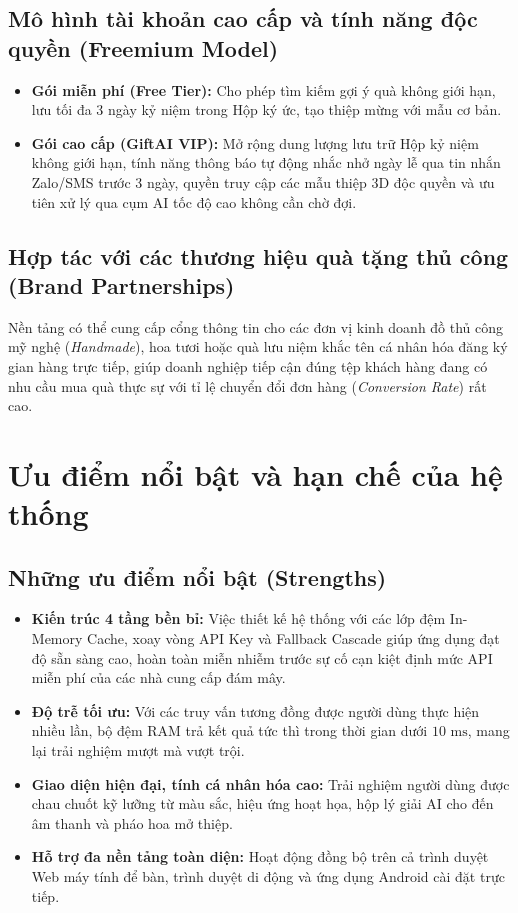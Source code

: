 \subsection{Mô hình tài khoản cao cấp và tính năng độc quyền (Freemium Model)}
\begin{itemize}
    \item \textbf{Gói miễn phí (Free Tier):} Cho phép tìm kiếm gợi ý quà không giới hạn, lưu tối đa 3 ngày kỷ niệm trong Hộp ký ức, tạo thiệp mừng với mẫu cơ bản.
    \item \textbf{Gói cao cấp (GiftAI VIP):} Mở rộng dung lượng lưu trữ Hộp kỷ niệm không giới hạn, tính năng thông báo tự động nhắc nhở ngày lễ qua tin nhắn Zalo/SMS trước 3 ngày, quyền truy cập các mẫu thiệp 3D độc quyền và ưu tiên xử lý qua cụm AI tốc độ cao không cần chờ đợi.
\end{itemize}

\subsection{Hợp tác với các thương hiệu quà tặng thủ công (Brand Partnerships)}
Nền tảng có thể cung cấp cổng thông tin cho các đơn vị kinh doanh đồ thủ công mỹ nghệ (\textit{Handmade}), hoa tươi hoặc quà lưu niệm khắc tên cá nhân hóa đăng ký gian hàng trực tiếp, giúp doanh nghiệp tiếp cận đúng tệp khách hàng đang có nhu cầu mua quà thực sự với tỉ lệ chuyển đổi đơn hàng (\textit{Conversion Rate}) rất cao.

\section{Ưu điểm nổi bật và hạn chế của hệ thống}

\subsection{Những ưu điểm nổi bật (Strengths)}
\begin{itemize}
    \item \textbf{Kiến trúc 4 tầng bền bỉ:} Việc thiết kế hệ thống với các lớp đệm In-Memory Cache, xoay vòng API Key và Fallback Cascade giúp ứng dụng đạt độ sẵn sàng cao, hoàn toàn miễn nhiễm trước sự cố cạn kiệt định mức API miễn phí của các nhà cung cấp đám mây.
    \item \textbf{Độ trễ tối ưu:} Với các truy vấn tương đồng được người dùng thực hiện nhiều lần, bộ đệm RAM trả kết quả tức thì trong thời gian dưới $10\text{ ms}$, mang lại trải nghiệm mượt mà vượt trội.
    \item \textbf{Giao diện hiện đại, tính cá nhân hóa cao:} Trải nghiệm người dùng được chau chuốt kỹ lưỡng từ màu sắc, hiệu ứng hoạt họa, hộp lý giải AI cho đến âm thanh và pháo hoa mở thiệp.
    \item \textbf{Hỗ trợ đa nền tảng toàn diện:} Hoạt động đồng bộ trên cả trình duyệt Web máy tính để bàn, trình duyệt di động và ứng dụng Android cài đặt trực tiếp.
\end{itemize}

